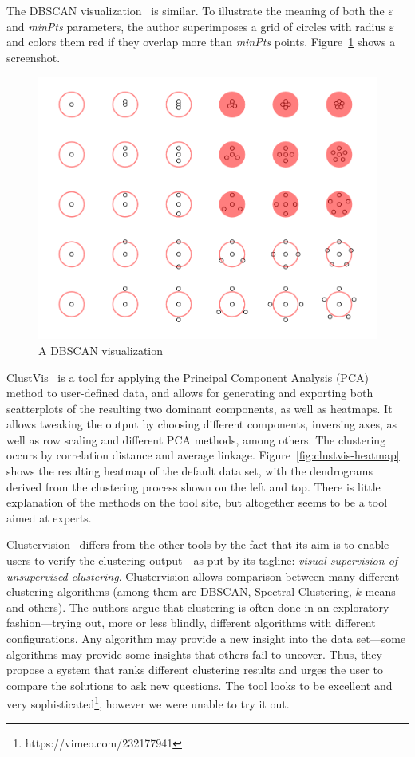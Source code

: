 \documentclass{vgtc} %
\begin{document}
The DBSCAN visualization~\cite{dbscan} is similar. To illustrate the meaning of
both the $\varepsilon$ and \emph{minPts} parameters, the author superimposes a
grid of circles with radius $\varepsilon$ and colors them red if they overlap
more than \emph{minPts} points. Figure~\ref{fig:dbscan} shows a screenshot.

\begin{figure}[tb]
    \centering
    \includegraphics[width=0.7\columnwidth]{dbscan}
    \caption{A DBSCAN visualization}
    \label{fig:dbscan}
\end{figure}

ClustVis~\cite{clustvis} is a tool for applying the Principal Component Analysis (PCA) method
to user-defined data, and allows for generating and exporting both scatterplots
of the resulting two dominant components, as well as heatmaps. It allows tweaking
the output by choosing different components, inversing axes, as well as row scaling
and different PCA methods, among others. The clustering occurs by correlation distance
and average linkage. Figure~\ref{fig:clustvis-heatmap} shows the resulting heatmap of
the default data set, with the dendrograms derived from the clustering process shown
on the left and top. There is little explanation of the methods on the tool site, but
altogether seems to be a tool aimed at experts.

Clustervision~\cite{clustervision} differs from the other tools by the fact
that its aim is to enable users to verify the clustering output---as put by its
tagline: \emph{visual supervision of unsupervised clustering}. Clustervision
allows comparison between many different clustering algorithms (among them are
DBSCAN, Spectral Clustering, $k$-means and others). The authors argue that
clustering is often done in an exploratory fashion---trying out, more or less
blindly, different algorithms with different configurations. Any algorithm may
provide a new insight into the data set---some algorithms may provide some
insights that others fail to uncover. Thus, they propose a system that ranks
different clustering results and urges the user to compare the solutions to ask
new questions. The tool looks to be excellent and very sophisticated\footnote{https://vimeo.com/232177941},
however we were unable to try it out.
\end{document}
